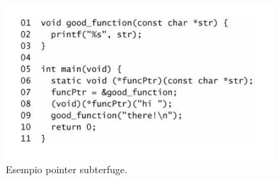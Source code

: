 \begin{figure}[H]
	\centering
	\includegraphics[width=10cm, keepaspectratio]{capitoli/secure_coding/img/cap_5/ult_es_point_sub.png}
	\caption{Esempio pointer subterfuge.}\label{fig:ult_es_poin}
\end{figure}

